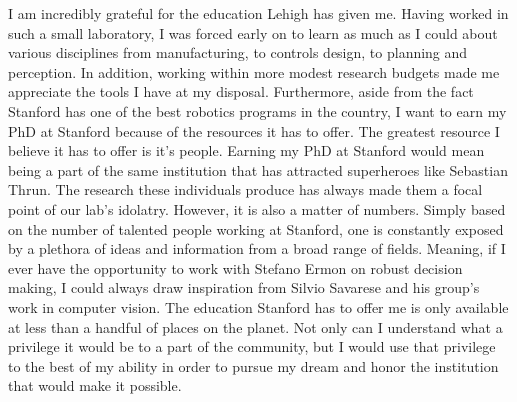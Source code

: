 \documentclass[12pt]{article}
\begin{document}
I am incredibly grateful for the education Lehigh has given me. Having worked
in such a small laboratory, I was forced early on to learn as much as I could
about various disciplines from manufacturing, to controls design, to planning
and perception. In addition, working within more modest research budgets made
me appreciate the tools I have at my disposal. Furthermore, aside from the fact
Stanford has one of the best robotics programs in the country, I want to earn
my PhD at Stanford because of the resources it has to offer. The greatest
resource I believe it has to offer is it's people. Earning my PhD at Stanford
would mean being a part of the same institution that has attracted superheroes
like Sebastian Thrun. The research these individuals produce has always made
them a focal point of our lab's idolatry. However, it is also a matter of
numbers.  Simply based on the number of talented people working at Stanford,
one is constantly exposed by a plethora of ideas and information from a broad
range of fields. Meaning, if I ever have the opportunity to work with Stefano
Ermon on robust decision making, I could always draw inspiration from Silvio
Savarese and his group's work in computer vision. The education Stanford has to
offer me is only available at less than a handful of places on the planet. Not
only can I understand what a privilege it would be to a part of the community,
but I would use that privilege to the best of my ability in order to pursue my
dream and honor the institution that would make it possible.
\end{document}
